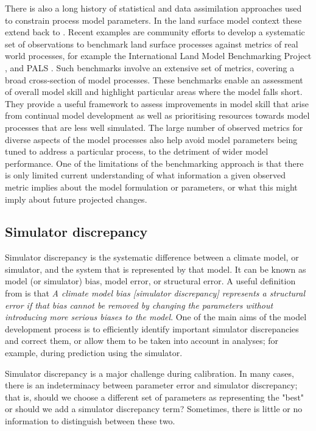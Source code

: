\documentclass[esd, manuscript]{copernicus}
\begin{document}
There is also a long history of statistical and data assimilation approaches used to constrain process model parameters. In the land surface model context these extend back to \citep{sellers1996revised}. Recent examples are community efforts to develop a systematic set of observations to benchmark land surface processes against metrics of real world processes, for example the International Land Model Benchmarking Project \citep{luo2012framework}, and PALS \citep{abramowitz2012benchmarking}.  Such benchmarks involve an extensive set of metrics, covering a broad cross-section of model processes.  These benchmarks enable an assessment of overall model skill and highlight particular areas where the model falls short.  They provide a useful framework to assess improvements in model skill that arise from continual model development as well as prioritising resources towards model processes that are less well simulated.  The large number of observed metrics for diverse aspects of the model processes also help avoid model parameters being tuned to address a particular process, to the detriment of wider model performance. One of the limitations of the benchmarking approach is that there is only limited current understanding of what information a given observed metric implies about the model formulation or parameters, or what this might imply about future projected changes.


\subsection{Simulator discrepancy}

Simulator discrepancy is the systematic difference between a climate model, or simulator, and the system that is represented by that model. It can be known as model (or simulator) bias, model error, or structural error. A useful definition from \citep{williamson2014identifying} is that \emph{A climate model bias [simulator discrepancy] represents a structural error if that bias cannot be removed by changing the parameters without introducing more serious biases to the model}. One of the main aims of the model development process is to efficiently identify important simulator discrepancies and correct them, or allow them to be taken into account in analyses; for example, during prediction using the simulator.

Simulator discrepancy is a major challenge during calibration. In many cases, there is an indeterminacy between parameter error and simulator discrepancy; that is, should we choose a different set of parameters as representing the "best" or should we add a simulator discrepancy term? Sometimes, there is little or no information to distinguish between these two.
\end{document}
